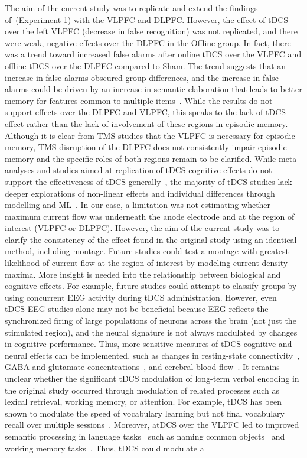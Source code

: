 \documentclass[10pt,letterpaper]{article}
\begin{document}
The aim of the current study was to replicate and extend the findings of~\cite{medvedeva2019effects}(Experiment 1) with the VLPFC and DLPFC. However, the effect of tDCS over the left VLPFC (decrease in false recognition) was not replicated, and there were weak, negative effects over the DLPFC in the Offline group. In fact, there was a trend toward increased false alarms after online tDCS over the VLPFC and offline tDCS over the DLPFC compared to Sham. The trend suggests that an increase in false alarms obscured group differences, and the increase in false alarms could be driven by an increase in semantic elaboration that leads to better memory for features common to multiple items~\cite{einstein1980levels, staresina2009event}. While the results do not support effects over the DLPFC and VLPFC, this speaks to the lack of tDCS effect rather than the lack of involvement of these regions in episodic memory. Although it is clear from TMS studies that the VLPFC is necessary for episodic memory, TMS disruption of the DLPFC does not consistently impair episodic memory and the specific roles of both regions remain to be clarified. While meta-analyses and studies aimed at replication of tDCS cognitive effects do not support the effectiveness of tDCS generally~\cite{horvath2015quantitative,vannorsdall2016reproducibility}, the majority of tDCS studies lack deeper explorations of non-linear effects and individual differences through modelling and ML~\cite{peterchev2017neuromodulation}. In our case, a limitation was not estimating whether maximum current flow was underneath the anode electrode and at the region of interest (VLPFC or DLPFC). However, the aim of the current study was to clarify the consistency of the effect found in the original study using an identical method, including montage. Future studies could test a montage with greatest likelihood of current flow at the region of interest by modeling current density maxima. More insight is needed into the relationship between biological and cognitive effects. For example, future studies could attempt to classify groups by using concurrent EEG activity during tDCS administration.  However, even tDCS-EEG studies alone may not be beneficial because EEG reflects the synchronized firing of large populations of neurons across the brain (not just the stimulated region), and the neural signature is not always modulated by changes in cognitive performance. Thus, more sensitive measures of tDCS cognitive and neural effects can be implemented, such as changes in resting-state connectivity~\cite{stagg2014local}, GABA and glutamate concentrations~\cite{bachtiar2015modulation}, and cerebral blood flow~\cite{paquette2011bilateral}. It remains unclear whether the significant tDCS modulation of long-term verbal encoding in the original study occurred through modulation of related processes such as lexical retrieval, working memory, or attention. For example, tDCS has been shown to modulate the speed of vocabulary learning but not final vocabulary recall over multiple sessions~\cite{meinzer2014transcranial}. Moreover, atDCS over the VLPFC led to improved semantic processing in language tasks~\cite{pisoni2015guess} such as naming common objects~\cite{fertonani2010naming} and working memory tasks~\cite{fregni2005anodal}. Thus, tDCS could modulate a 
\end{document}
